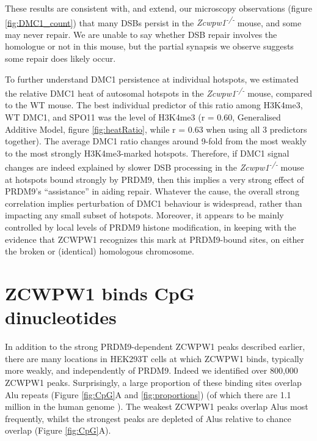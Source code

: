 These results are consistent with, and extend, our microscopy observations (figure \ref{fig:DMC1_count}) that many DSBs persist in the \textit{Zcwpw1\textsuperscript{-/-}} mouse, and some may never repair.
We are unable to say whether DSB repair involves the homologue or not in this mouse, but the partial synapsis we observe suggests some repair does likely occur.

To further understand DMC1 persistence at individual hotspots, we estimated the relative DMC1 heat of autosomal hotspots in the \textit{Zcwpw1\textsuperscript{-/-}} mouse, compared to the WT mouse.
The best individual predictor of this ratio among H3K4me3, WT DMC1, and SPO11 was the level of H3K4me3 (r = 0.60, Generalised Additive Model, figure \ref{fig:heatRatio}, while r = 0.63 when using all 3 predictors together).
The average DMC1 ratio changes around 9-fold from the most weakly to the most strongly H3K4me3-marked hotspots.
Therefore, if DMC1 signal changes are indeed explained by slower DSB processing in the \textit{Zcwpw1\textsuperscript{-/-}} mouse at hotspots bound strongly by PRDM9, then this implies a very strong effect of PRDM9's ``assistance'' in aiding repair.
Whatever the cause, the overall strong correlation implies perturbation of DMC1 behaviour is widespread, rather than impacting any small subset of hotspots.
Moreover, it appears to be mainly controlled by local levels of PRDM9 histone modification, in keeping with the evidence that ZCWPW1 recognizes this mark at PRDM9-bound sites, on either the broken or (identical) homologous chromosome.

\section{ZCWPW1 binds CpG dinucleotides}
In addition to the strong PRDM9-dependent ZCWPW1 peaks described earlier, there are many locations in HEK293T cells at which ZCWPW1 binds, typically more weakly, and independently of PRDM9.
Indeed we identified over 800,000 ZCWPW1 peaks.
Surprisingly, a large proportion of these binding sites overlap Alu repeats (Figure \ref{fig:CpG}A and \ref{fig:proportions}) (of which there are 1.1 million in the human genome \parencite{Deininger2011Alu}).
The weakest ZCWPW1 peaks overlap Alus most frequently, whilst the strongest peaks are depleted of Alus relative to chance overlap (Figure \ref{fig:CpG}A).

